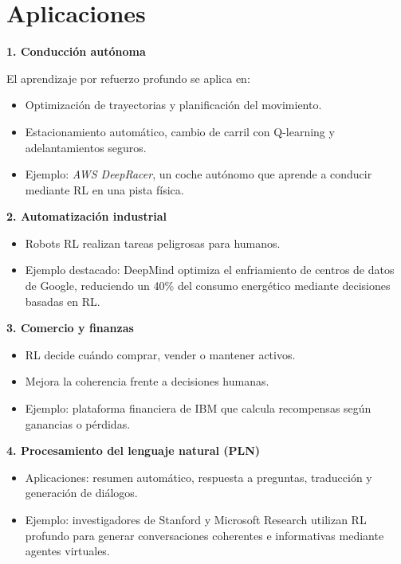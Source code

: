 \section{Aplicaciones}

\textbf{1. Conducción autónoma}

El aprendizaje por refuerzo profundo se aplica en:
\begin{itemize}
    \item Optimización de trayectorias y planificación del movimiento.
    \item Estacionamiento automático, cambio de carril con Q-learning y adelantamientos seguros.
    \item Ejemplo: \textit{AWS DeepRacer}, un coche autónomo que aprende a conducir mediante RL en una pista física.
\end{itemize}

\textbf{2. Automatización industrial}

\begin{itemize}
    \item Robots RL realizan tareas peligrosas para humanos.
    \item Ejemplo destacado: DeepMind optimiza el enfriamiento de centros de datos de Google, reduciendo un 40\% del consumo energético mediante decisiones basadas en RL.
\end{itemize}

\textbf{3. Comercio y finanzas}

\begin{itemize}
    \item RL decide cuándo comprar, vender o mantener activos.
    \item Mejora la coherencia frente a decisiones humanas.
    \item Ejemplo: plataforma financiera de IBM que calcula recompensas según ganancias o pérdidas.
\end{itemize}

\textbf{4. Procesamiento del lenguaje natural (PLN)}

\begin{itemize}
    \item Aplicaciones: resumen automático, respuesta a preguntas, traducción y generación de diálogos.
    \item Ejemplo: investigadores de Stanford y Microsoft Research utilizan RL profundo para generar conversaciones coherentes e informativas mediante agentes virtuales.
\end{itemize}

